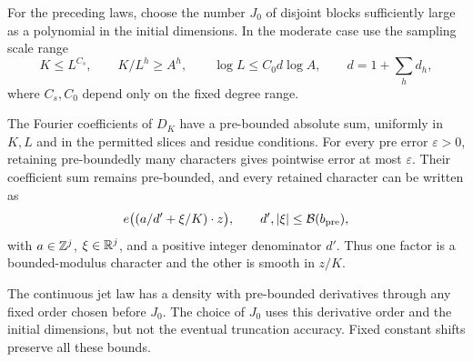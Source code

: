 \begin{lemma}
\label{cube:product-block}
For the preceding laws, choose the number $J_0$ of disjoint
blocks sufficiently large as a polynomial in the initial
dimensions. In the moderate case use the sampling scale range
\[
 K\le L^{C_s},\qquad K/L^h\ge A^h,
 \qquad \log L\le C_0d\log A,
 \qquad d=1+\sum_h d_h,
\]
where $C_s,C_0$ depend only on the fixed degree range.

The Fourier coefficients of $D_K$ have a pre-bounded absolute
sum, uniformly in $K,L$ and in the permitted slices and residue
conditions. For every pre error $\varepsilon>0$, retaining
pre-boundedly many characters gives pointwise error at most
$\varepsilon$. Their coefficient sum remains pre-bounded,
and every retained character can be written as
\begin{equation}
 e\bigl((a/d'+\xi/K)\cdot z\bigr),
 \qquad d',|\xi|\le\mathcal B(b_{\rm pre}),
 \label{cube:major-character}
\end{equation}
with $a\in\mathbb Z^j$, $\xi\in\mathbb R^j$, and a positive integer denominator $d'$.
Thus one factor is a bounded-modulus character and the other
is smooth in $z/K$.

The continuous jet law has a density with pre-bounded
derivatives through any fixed order chosen before $J_0$.
The choice of $J_0$ uses this derivative order and the initial
dimensions, but not the eventual truncation accuracy. Fixed
constant shifts preserve all these bounds.
\end{lemma}

